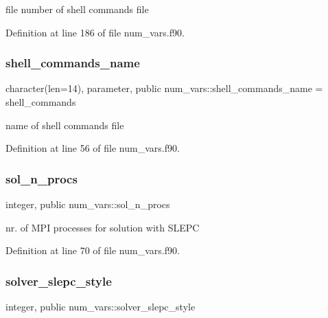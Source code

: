 file number of shell commands file 



Definition at line 186 of file num\+\_\+vars.\+f90.

\mbox{\label{namespacenum__vars_af30710083de41ebf93a407412d3125e5}} 
\subsubsection{\texorpdfstring{shell\+\_\+commands\+\_\+name}{shell\_commands\_name}}
{\footnotesize\ttfamily character(len=14), parameter, public num\+\_\+vars\+::shell\+\_\+commands\+\_\+name = \textquotesingle{}shell\+\_\+commands\textquotesingle{}}



name of shell commands file 



Definition at line 56 of file num\+\_\+vars.\+f90.

\mbox{\label{namespacenum__vars_a03373a7c9a040867e8108023f2ccf479}} 
\subsubsection{\texorpdfstring{sol\+\_\+n\+\_\+procs}{sol\_n\_procs}}
{\footnotesize\ttfamily integer, public num\+\_\+vars\+::sol\+\_\+n\+\_\+procs}



nr. of M\+PI processes for solution with S\+L\+E\+PC 



Definition at line 70 of file num\+\_\+vars.\+f90.

\mbox{\label{namespacenum__vars_aff32519d88708f2f44f80d62cfb0e0f4}} 
\subsubsection{\texorpdfstring{solver\+\_\+slepc\+\_\+style}{solver\_slepc\_style}}
{\footnotesize\ttfamily integer, public num\+\_\+vars\+::solver\+\_\+slepc\+\_\+style}




